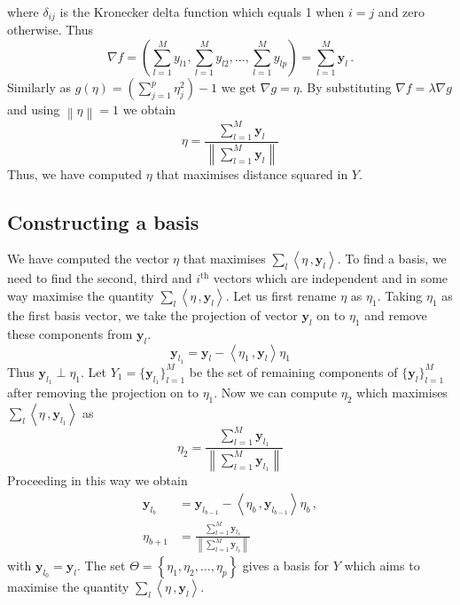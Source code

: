 \documentclass[11pt]{article}
\begin{document}
where $\delta_{ij}$ is the Kronecker delta function which equals 1 when $i=j$ and zero otherwise. Thus
\begin{equation}\label{eq:secMF8}
    \nabla f = \left(\sum_{l=1}^M y_{l1}, \sum_{l=1}^M y_{l2}, \ldots, \sum_{l=1}^M y_{lp}   \right) = \sum_{l=1}^M \bm{y}_l \, .
\end{equation}
Similarly as $g(\eta) = \left( \sum_{j=1}^p \eta_j^2\right) - 1$  we get $\nabla g = \eta$. By substituting  $\nabla f = \lambda \nabla g$ and using $\left\lVert \eta \right\rVert = 1 $ we obtain
\begin{equation}\label{eq:secMF9}
    \eta = \frac{\sum_{l=1}^M \bm{y}_l }{  \left\lVert\sum_{l=1}^M \bm{y}_l  \right\rVert  }
\end{equation}
Thus, we have computed $\eta$ that maximises distance squared in $Y$.  

\subsection{Constructing a basis}\label{sec:MathFrame3}
We have computed the vector $\eta$ that maximises $\sum_{l}\left\langle \eta\, ,  \bm{y}_{l} \right\rangle$. To find a basis,  we need to find the second, third and $i^{\text{th}}$ vectors which are independent and in some way maximise the quantity $\sum_{l}\left\langle \eta\, ,  \bm{y}_{l} \right\rangle$. Let us first rename $\eta$ as $\eta_1$. Taking $\eta_1$ as the first basis vector, we take the projection of vector $\bm{y}_l$ on to $\eta_1$  and remove these components from $\bm{y}_l$. 
\begin{equation}\label{eq:secMF10}
    \bm{y}_{l_1} = \bm{y}_l - \left\langle \eta_1 \, , \bm{y}_l \right \rangle \eta_1
\end{equation}
Thus $\bm{y}_{l_1} \perp \eta_1$. Let $Y_1 = \{\bm{y}_{l_1} \}_{l=1}^M $ be the set of remaining components of $\{ \bm{y}_l \}_{l=1}^M$ after removing the projection on to $\eta_1$. Now we can compute $\eta_2$ which maximises $\sum_{l}\left\langle \eta\, ,  \bm{y}_{l_1} \right\rangle$ as
\begin{equation}\label{eq:secMF11}
    \eta_2 = \frac{\sum_{l=1}^M \bm{y}_{l_1} }{  \left\lVert\sum_{l=1}^M \bm{y}_{l_1}  \right\rVert  } 
\end{equation}
Proceeding in this way we obtain 
\begin{align}
    \bm{y}_{l_{b}} & = \bm{y}_{l_{b-1}} - \left\langle \eta_b \, , \bm{y}_{l_{b-1}} \right \rangle \eta_b \, , \label{eq:secMF12} \\
     \eta_{b+1} & = \frac{\sum_{l=1}^M \bm{y}_{l_b} }{  \left\lVert\sum_{l=1}^M \bm{y}_{l_b}  \right\rVert  } \label{eq:secMF13}
\end{align}
with $\bm{y}_{l_0} = \bm{y}_{l}$. The set $\Theta = \left\{ \eta_1, \eta_2, \ldots , \eta_p  \right\}$ gives a basis for $Y$ which aims to maximise the quantity $\sum_{l}\left\langle \eta\, ,  \bm{y}_{l} \right\rangle$.  \\
\end{document}
